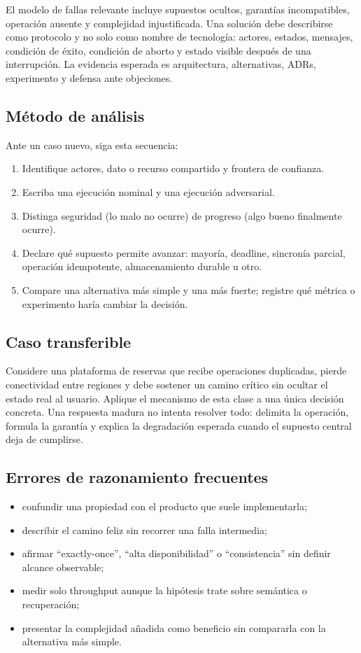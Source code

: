 \documentclass[variant=apuntes,cover=institutional,mode=screen]{ua-engineering-v6-article}
\begin{document}
El modelo de fallas relevante incluye supuestos ocultos, garantías incompatibles, operación ausente y complejidad injustificada. Una solución debe describirse como protocolo y no solo como nombre de tecnología: actores, estados, mensajes, condición de éxito, condición de aborto y estado visible después de una interrupción. La evidencia esperada es arquitectura, alternativas, ADRs, experimento y defensa ante objeciones.

\subsection{Método de análisis}
Ante un caso nuevo, siga esta secuencia:
\begin{enumerate}
\item Identifique actores, dato o recurso compartido y frontera de confianza.
\item Escriba una ejecución nominal y una ejecución adversarial.
\item Distinga seguridad (lo malo no ocurre) de progreso (algo bueno finalmente ocurre).
\item Declare qué supuesto permite avanzar: mayoría, deadline, sincronía parcial, operación idempotente, almacenamiento durable u otro.
\item Compare una alternativa más simple y una más fuerte; registre qué métrica o experimento haría cambiar la decisión.
\end{enumerate}

\subsection{Caso transferible}
Considere una plataforma de reservas que recibe operaciones duplicadas, pierde conectividad entre regiones y debe sostener un camino crítico sin ocultar el estado real al usuario. Aplique el mecanismo de esta clase a una única decisión concreta. Una respuesta madura no intenta resolver todo: delimita la operación, formula la garantía y explica la degradación esperada cuando el supuesto central deja de cumplirse.

\subsection{Errores de razonamiento frecuentes}
\begin{itemize}
\item confundir una propiedad con el producto que suele implementarla;
\item describir el camino feliz sin recorrer una falla intermedia;
\item afirmar ``exactly-once'', ``alta disponibilidad'' o ``consistencia'' sin definir alcance observable;
\item medir solo throughput aunque la hipótesis trate sobre semántica o recuperación;
\item presentar la complejidad añadida como beneficio sin compararla con la alternativa más simple.
\end{itemize}
\end{document}
